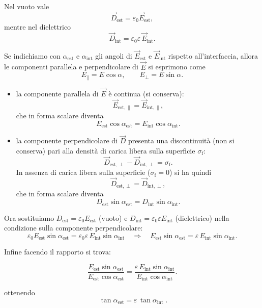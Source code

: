 \documentclass{book}
\begin{document}
Nel vuoto vale
\[
\vec{D}_{\mathrm{est}}=\varepsilon_0\vec{E}_{\mathrm{est}},
\]
mentre nel dielettrico 
\[
\vec{D}_{\mathrm{int}}=\varepsilon_0\varepsilon\,\vec{E}_{\mathrm{int}}.
\]

Se indichiamo con \(\alpha_{\text{est}}\) e \(\alpha_{\text{int}}\) gli angoli di \(\vec{E}_{\text{est}}\) e \(\vec{E}_{\text{int}}\) rispetto all'interfaccia, allora le componenti parallela e perpendicolare di \(\vec{E}\) si esprimono come
\[
E_{\parallel}=E\cos\alpha,\qquad E_{\perp}=E\sin\alpha.
\]

\begin{itemize}
  \item la componente parallela di \(\vec{E}\) è continua (si conserva):
  \[
  \vec{E}_{\mathrm{est},\parallel}=\vec{E}_{\mathrm{int},\parallel},
  \]
  che in forma scalare diventa
  \[
  E_{\mathrm{est}}\cos\alpha_{\mathrm{est}} = E_{\mathrm{int}}\cos\alpha_{\mathrm{int}}.
  \]

  \item la componente perpendicolare di \(\vec{D}\) presenta una discontinuità (non si conserva) pari alla densità di carica libera sulla superficie \(\sigma_{\mathrm{f}}\):
  \[
  \vec{D}_{\mathrm{est},\perp}-\vec{D}_{\mathrm{int},\perp}=\sigma_{\mathrm{f}}.
  \]
  In assenza di carica libera sulla superficie (\(\sigma_{\mathrm{f}}=0\)) si ha quindi
  \[
  \vec{D}_{\mathrm{est},\perp}=\vec{D}_{\mathrm{int},\perp},
  \]
  che in forma scalare diventa
  \[
  D_{\mathrm{est}}\sin\alpha_{\mathrm{est}} = D_{\mathrm{int}}\sin\alpha_{\mathrm{int}}.
  \]
\end{itemize}
\vspace{0.2cm}
Ora sostituiamo \(D_{\mathrm{est}}=\varepsilon_0 E_{\mathrm{est}}\) (vuoto) e \(D_{\mathrm{int}}=\varepsilon_0\varepsilon E_{\mathrm{int}}\) (dielettrico) nella condizione sulla componente perpendicolare:
\[
\varepsilon_0 E_{\mathrm{est}}\sin\alpha_{\mathrm{est}}
= \varepsilon_0\varepsilon\,E_{\mathrm{int}}\sin\alpha_{\mathrm{int}}
\quad\Longrightarrow\quad
E_{\mathrm{est}}\sin\alpha_{\mathrm{est}} = \varepsilon\,E_{\mathrm{int}}\sin\alpha_{\mathrm{int}}.
\]

Infine facendo il rapporto si trova:

\[
\frac{E_{\mathrm{est}}\sin\alpha_{\mathrm{est}}}{E_{\mathrm{est}}\cos\alpha_{\mathrm{est}}}
= \frac{\varepsilon\,E_{\mathrm{int}}\sin\alpha_{\mathrm{int}}}{E_{\mathrm{int}}\cos\alpha_{\mathrm{int}}}.
\]

ottenendo
\[
\boxed{\;\tan\alpha_{\mathrm{est}}=\varepsilon\,\tan\alpha_{\mathrm{int}}\; }.
\]
\end{document}
